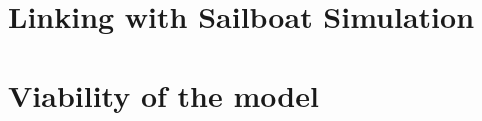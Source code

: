\documentclass[twoside,12pt]{report} %
\begin{document}
\chapter{Linking with Sailboat Simulation}


\chapter{Viability of the model}



%


\nocite{*}


\end{document}
